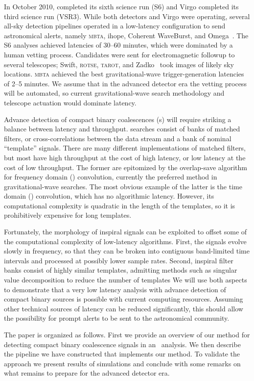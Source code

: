 In October 2010, \LIGO{} completed its sixth science run
(S6) and Virgo completed its third science run (VSR3).  While both
\LIGO{} detectors and Virgo were operating, several all-sky detection
pipelines operated in a low-latency configuration to send astronomical alerts,
namely \textsc{mbta}, ihope,
Coherent WaveBurst, and Omega~\cite{HugheyGWPAW2011, S6lowlatency}.
 The S6 analyses
achieved latencies of 30--60 minutes, which were dominated by a human vetting
process. Candidates were sent for electromagnetic followup to several
telescopes; Swift, \textsc{rotse}, \textsc{tarot}, and Zadko~\cite{kanner2008,
HugheyGWPAW2011} took images of likely sky locations.  \textsc{mbta} achieved
the best gravitational-wave trigger-generation latencies of 2--5 minutes.  We
assume that in the advanced detector era the vetting process will be automated,
so current gravitational-wave search methodology and telescope actuation would
dominate latency.

Advance detection of compact binary coalescences (\CBC{}s) will require striking a balance between latency
and throughput.  \CBC{} searches consist of banks of matched filters, or
cross-correlations between the data stream and a bank of nominal ``template''
signals.  There are many different implementations of matched filters, but most
have high throughput at the cost of high latency, or low latency at the cost of
low throughput.  The former are epitomized by the overlap-save algorithm
\cite{numerical-recipes-chapter-13} for frequency domain (\FD) convolution,
currently the preferred method in gravitational-wave
searches.  The most obvious example of the latter is the time domain
(\TD) convolution, which has no algorithmic latency.  However, its
computational complexity is quadratic in the length of the templates, so it is
prohibitively expensive for long templates.

Fortunately, the morphology of inspiral signals can be exploited to offset some
of the computational complexity of low-latency algorithms.  First, the signals
evolve slowly in frequency, so that they can be broken into contiguous
band-limited time intervals and processed at possibly lower sample rates.
Second, inspiral filter banks consist of highly similar templates, admitting
methods such as singular value decomposition to reduce the number of templates\cite{Cannon:2010p10398}
We will use both aspects to demonstrate that a very
low latency analysis with advance detection of compact binary sources is
possible with current computing resources.  Assuming other technical sources of
latency can be reduced significantly, this should allow the possibility for
prompt alerts to be sent to the astronomical community.

The paper is organized as follows. First we provide an overview of our method
for detecting compact binary coalescence signals in an \earlywarning\ analysis.
We then describe the pipeline we have constructed that implements our method.
To validate the approach we present results of simulations and conclude with
some remarks on what remains to prepare for the advanced detector era.

